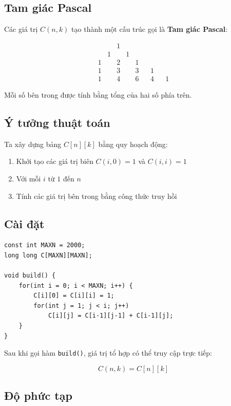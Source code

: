 \subsection*{Tam giác Pascal}

Các giá trị $C(n,k)$ tạo thành một cấu trúc gọi là \textbf{Tam giác Pascal}:

\[
\begin{matrix}
&&1\\
&1&&1\\
1&&2&&1\\
1&&3&&3&&1\\
1&&4&&6&&4&&1
\end{matrix}
\]

Mỗi số bên trong được tính bằng tổng của hai số phía trên.

\subsection*{Ý tưởng thuật toán}

Ta xây dựng bảng $C[n][k]$ bằng quy hoạch động:

\begin{enumerate}
\item Khởi tạo các giá trị biên $C(i,0)=1$ và $C(i,i)=1$
\item Với mỗi $i$ từ $1$ đến $n$
\item Tính các giá trị bên trong bằng công thức truy hồi
\end{enumerate}

\subsection*{Cài đặt}

\begin{tcolorbox}
\begin{verbatim}
const int MAXN = 2000;
long long C[MAXN][MAXN];

void build() {
    for(int i = 0; i < MAXN; i++) {
        C[i][0] = C[i][i] = 1;
        for(int j = 1; j < i; j++)
            C[i][j] = C[i-1][j-1] + C[i-1][j];
    }
}
\end{verbatim}
\end{tcolorbox}

Sau khi gọi hàm \texttt{build()}, giá trị tổ hợp có thể truy cập trực tiếp:

\[
C(n,k) = C[n][k]
\]

\subsection*{Độ phức tạp}

